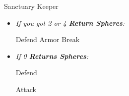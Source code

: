 \bothvfill
\winvfill
\lossvfill
\begin{battle}[40000]{Sanctuary Keeper}
    \begin{itemize}
        \item \textit{If you got 2 or 4 \textbf{Return Spheres}:}
            \begin{itemize}
                \yunaf Defend
                \tidusf Armor Break
            \end{itemize}
        \item \textit{If 0 \textbf{Returns Spheres}:}
            \begin{itemize}
                \tidusf Defend
            \end{itemize}
        \summon{\bahamut}
        \bahamutf Attack
    \end{itemize}
\end{battle}
